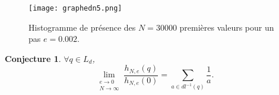 \documentclass[a4paper, 12pt]{article}
\newtheorem*{conj}{Conjecture}
\begin{document}
\begin{figure}[ht]
\begin{center}
\texttt{[image: graphedn5.png]}
\end{center}
\caption{\footnotesize{Histogramme de présence des $N=30000$ premières valeurs pour un pas $e=0.002$.}}
\label{nuagen 5}
\end{figure}

\begin{conj} $\forall q \in L_d$,
\[ \lim_{\begin{smallmatrix}  e \to 0 \\ N \to \infty \end{smallmatrix}} \frac{h_{N,e}(q)}{h_{N,e}(0)} =  \sum_{a \in dl^{-1}(q)}^{} \frac{1}{a}.\] \end{conj}


\end{document}
